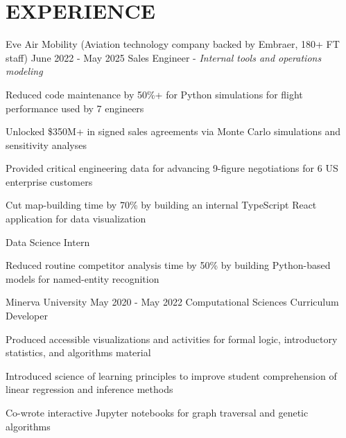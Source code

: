 \section{EXPERIENCE}

\begin{experience}
                   {Eve Air Mobility \textnormal{(Aviation technology company backed by Embraer, 180+ FT staff)}}
                   {June 2022 - May 2025}
                   {Sales Engineer - \textnormal{\textit{Internal tools and operations modeling}}}
    \item Reduced code maintenance by 50\%+ for Python simulations for flight performance used by 7 engineers
    \item Unlocked \$350M+ in signed sales agreements via Monte Carlo simulations and sensitivity analyses
    \item Provided critical engineering data for advancing 9-figure negotiations for 6 US enterprise customers
    \item Cut map-building time by 70\% by building an internal TypeScript React application for data visualization 
\end{experience}

\vspace{0.1 cm}

\begin{same_org_experience}
                   {Data Science Intern}
    \item Reduced routine competitor analysis time by 50\% by building Python-based models for named-entity recognition 
\end{same_org_experience}

\begin{exclude}{
    \begin{experience}
                   {Minerva University}
                   {May 2020 - May 2022}
                   {Computational Sciences Curriculum Developer}
    \item Produced accessible visualizations and activities for formal logic, introductory statistics, and algorithms material
    \item Introduced science of learning principles to improve student comprehension of linear regression and inference methods
    \item Co-wrote interactive Jupyter notebooks for graph traversal and genetic algorithms
\end{experience}
}
\end{exclude}

